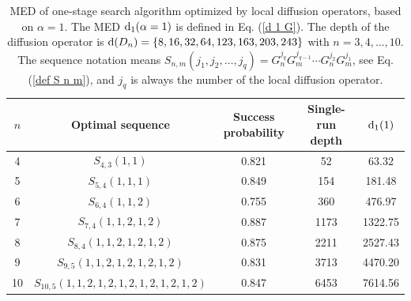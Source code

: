 \documentclass[%
 twocolumn,
 10pt,
 superscriptaddress,
 longbibliography,
 amsmath,amssymb,
 aps,
 pra,
floatfix,
]{revtex4-1}
\begin{document}
\begin{table}[h]

    \begin{ruledtabular}
	\caption{\label{Table 2} MED of one-stage search algorithm optimized by local diffusion operators, based on $\alpha=1$. The MED $\text d_1(\alpha=1)$ is defined in Eq. (\ref{d 1 G}). The depth of the diffusion operator is $\text d(D_n)=\{8,16,32,64,123,163,203,243\}$ with $n=3,4,\ldots,10$. The sequence notation means $S_{n,m}(j_1,j_2,\ldots,j_q) = G_n^{j_q}G_m^{j_{q-1}}\cdots G_n^{j_2}G_m^{j_1}$, see Eq. (\ref{def S n m}), and $j_q$ is always the number of the local diffusion operator.}
	    \begin{tabular}{ccccc}
		
		$n$ & Optimal sequence & Success probability &  Single-run depth & $\text d_1(1)$  \\ \hline
		
		4 & $S_{4,3}(1,1)$ & 0.821 & 52 & 63.32  \\
		
		5 & $S_{5,4}(1,1,1)$ & 0.849 & 154 & 181.48 \\
		
		6 & $S_{6,4}(1,1,2)$ & 0.755 & 360 & 476.97 \\
		
		7 & $S_{7,4}(1,1,2,1,2)$ & 0.887 & 1173 & 1322.75 \\
		
		8 & $S_{8,4}(1,1,2,1,2,1,2)$ & 0.875 & 2211 & 2527.43 \\
		
		9 & $S_{9,5}(1,1,2,1,2,1,2,1,2)$ & 0.831 & 3713 & 4470.20 \\
		
		10 & $S_{10,5}(1,1,2,1,2,1,2,1,2,1,2,1,2)$ & 0.847 & 6453 & 7614.56 \\
		
	    \end{tabular}
	\end{ruledtabular}
\end{table}
\end{document}
